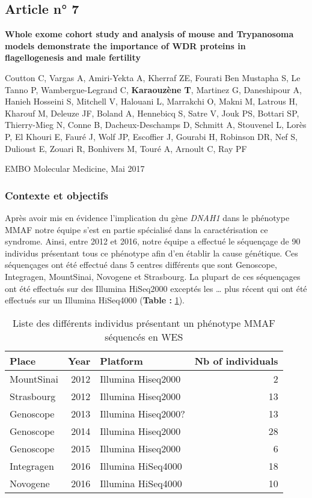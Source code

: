 \documentclass[12pt,twoside]{reedthesis}
\theoremstyle{definition}
\theoremstyle{definition}
\theoremstyle{remark}
\begin{document}
  \subsection{Article n° 7}\label{article-n-7}
  
  \textbf{Whole exome cohort study and analysis of mouse and Trypanosoma
  models demonstrate the importance of WDR proteins in flagellogenesis and
  male fertility}
  
  Coutton C, Vargas A, Amiri-Yekta A, Kherraf ZE, Fourati Ben Mustapha S,
  Le Tanno P, Wambergue-Legrand C, \textbf{Karaouzène T}, Martinez G,
  Daneshipour A, Hanieh Hosseini S, Mitchell V, Halouani L, Marrakchi O,
  Makni M, Latrous H, Kharouf M, Deleuze JF, Boland A, Hennebicq S, Satre
  V, Jouk PS, Bottari SP, Thierry-Mieg N, Conne B, Dacheux-Deschamps D,
  Schmitt A, Stouvenel L, Lorès P, El Khouri E, Fauré J, Wolf JP,
  Escoffier J, Gourabi H, Robinson DR, Nef S, Dulioust E, Zouari R,
  Bonhivers M, Touré A, Arnoult C, Ray PF
  
  EMBO Molecular Medicine, Mai 2017
  
  \newpage
  
  \subsubsection{Contexte et objectifs}\label{contexte-et-objectifs-4}
  
  Après avoir mis en évidence l'implication du gène \emph{DNAH1} dans le
  phénotype MMAF notre équipe s'est en partie spécialisé dans la
  caractérisation ce syndrome. Ainsi, entre 2012 et 2016, notre équipe a
  effectué le séquençage de 90 individus présentant tous ce phénotype afin
  d'en établir la cause génétique. Ces séquençages ont été effectué dans 5
  centres différents que sont Genoscope, Integragen, MountSinai, Novogene
  et Strasbourg. La plupart de ces séquençages ont été effectués sur des
  Illumina HiSeq2000 exceptés les \ldots{} plus récent qui ont été
  effectués sur un Illumina HiSeq4000 (\textbf{Table :
  }\ref{tab:tabrunbigmmaf}).
  
  \begin{longtable}[t]{lrlr}
  \caption{\label{tab:tabrunbigmmaf}Liste des différents individus présentant un phénotype MMAF séquencés en WES}\\
  \toprule
  Place & Year & Platform & Nb of individuals\\
  \midrule
  MountSinai & 2012 & Illumina Hiseq2000 & 2\\
  Strasbourg & 2012 & Illumina Hiseq2000 & 13\\
  Genoscope & 2013 & Illumina Hiseq2000? & 13\\
  Genoscope & 2014 & Illumina Hiseq2000 & 28\\
  Genoscope & 2015 & Illumina Hiseq2000 & 6\\
  \addlinespace
  Integragen & 2016 & Illumina HiSeq4000 & 18\\
  Novogene & 2016 & Illumina HiSeq4000 & 10\\
  \bottomrule
  \end{longtable}
  
\end{document}
